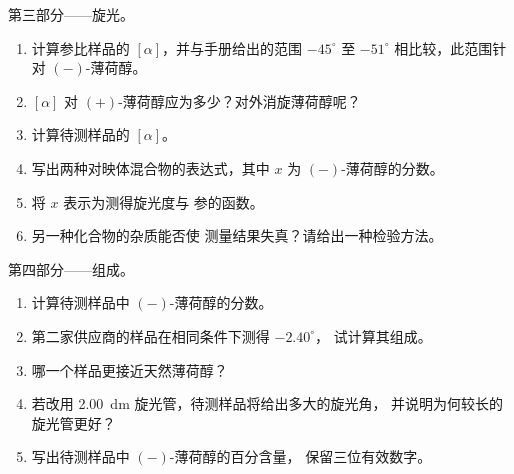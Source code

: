 \begin{problem}
\medskip
第三部分——旋光。
\begin{enumerate}[resume]
  \item 计算参比样品的 $[\alpha]$，并与手册给出的范围
        $-45^\circ$ 至 $-51^\circ$ 相比较，此范围针对 $(-)$-薄荷醇。
  \item $[\alpha]$ 对 $(+)$-薄荷醇应为多少？对外消旋薄荷醇呢？
  \item 计算待测样品的 $[\alpha]$。
  \item 写出两种对映体混合物的表达式，其中 $x$
        为 $(-)$-薄荷醇的分数。
  \item 将 $x$ 表示为测得旋光度与
        参的函数。
  \item 另一种化合物的杂质能否使
        测量结果失真？请给出一种检验方法。
\end{enumerate}

\medskip
第四部分——组成。
\begin{enumerate}[resume]
  \item 计算待测样品中 $(-)$-薄荷醇的分数。
  \item 第二家供应商的样品在相同条件下测得 $-2.40^\circ$，
        试计算其组成。
  \item 哪一个样品更接近天然薄荷醇？
  \item 若改用 \qty{2.00}{dm} 旋光管，待测样品将给出多大的旋光角，
        并说明为何较长的旋光管更好？
  \item 写出待测样品中 $(-)$-薄荷醇的百分含量，
        保留三位有效数字。
\end{enumerate}
\end{problem}
